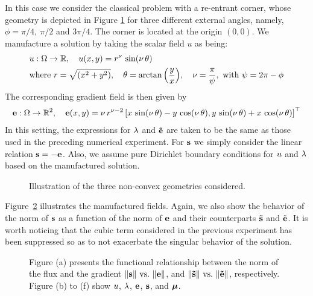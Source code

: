 In this case we consider the classical problem with a re-entrant corner, whose geometry is depicted in 
Figure \ref{fig:geometries_non_convex} for three different external angles, namely, $\phi =\pi/4,~\pi/2$ and $3\pi/4$. The corner is located at the origin $(0, 0)$. 
We manufacture a solution by taking the scalar field $u$ as being:
\begin{equation*}
	\begin{aligned}
	&u: \Omega \rightarrow \mathbb{R}, \quad u(x,y) = r^{\nu}\,\sin(\nu\,\theta) \\
	&\mbox{where}~r = \sqrt{\left(x^{2}+y^{2}\right)}, \quad \theta = \arctan{\left(\frac{y}{x}\right)}, \quad  \nu = \frac{\pi}{\psi},~\mbox{with}~\psi = 2\pi-\phi
	\end{aligned}
\end{equation*}
The corresponding gradient field is then given by
\begin{equation*}
	\begin{aligned}
	\mathbf{e}: \Omega \rightarrow \mathbb{R}^{2}, \quad \mathbf{e}(x,y) = \nu\,r^{\nu-2}\left[x\,\sin(\nu\,\theta)-y\,\cos(\nu\,\theta),y\,\sin(\nu\,\theta)+x\,\cos(\nu\,\theta)\right]^{\top}
	\end{aligned}
\end{equation*}
In this setting, the expressions for $\lambda$ and $\mathbf{\tilde{e}}$ are taken to be the same as those used in the preceding numerical experiment. For $\mathbf{s}$ we simply consider the linear relation $\mathbf{s} = -\mathbf{e}$.
Also, we assume pure Dirichlet boundary conditions for $u$ and $\lambda$ based on the manufactured solution.
\begin{figure}[h!]
	\centering
	\caption{Illustration of the three non-convex geometries considered.}
	\fontsize{11pt}{10pt}\selectfont 
	\def\svgwidth{1.0\columnwidth}
	
	\label{fig:geometries_non_convex}
\end{figure}
Figure~\ref{fig:all_fields_ref_non_convex} illustrates the manufactured fields. Again, we also show the behavior of the norm of $\mathbf{s}$ as a function of the norm of  $\mathbf{e}$ and their counterparts $ \mathbf{\tilde{s}}$ and $\mathbf{\tilde{e}} $.
It is worth noticing that the cubic term considered in the previous experiment has been suppressed so as to not exacerbate the singular behavior of the solution.
\begin{figure}[h!]
	\centering
	\caption{Figure (a) presents the functional relationship between the norm of the flux and the gradient $\|\mathbf{s}\|~\mbox{vs.}~\|\mathbf{e}\|$, and $\|\mathbf{\tilde{s}}\|~\mbox{vs.}~\|\mathbf{\tilde{e}}\|$, respectively. Figure (b) to (f) show $u$, $\lambda$, $\mathbf{e}$, $\mathbf{s}$, and $\boldsymbol{\mu}$.}
	\def\svgwidth{1.0\columnwidth}
	
	\label{fig:all_fields_ref_non_convex}
\end{figure}
